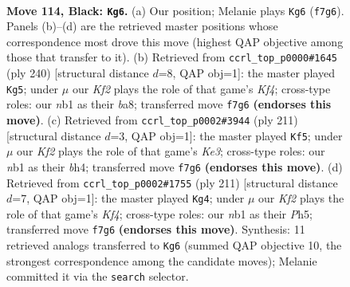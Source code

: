 \documentclass[11pt]{article}
\begin{document}
\clearpage

\begin{figure}[p]\centering
\begin{subfigure}{0.46\textwidth}\centering
\resizebox{\linewidth}{!}{%
\newchessgame
\chessboard[
  setfen={8/5k2/8/4B3/p1p3b1/8/5K2/1N6 b - - 83 114},
  showmover=false,
  pgfstyle=straightmove, color=movearrow, markmove={f7-g6}
]}
\caption{}
\end{subfigure}\hfill
\begin{subfigure}{0.46\textwidth}\centering
\resizebox{\linewidth}{!}{%
\newchessgame
\chessboard[
  setfen={b4B2/P7/4k3/2P5/5K2/8/8/8 w - - 11 121},
  showmover=false,
  pgfstyle=straightmove, color=movearrow, markmove={f4-g5}
]}
\caption{}
\end{subfigure}
\\[4pt]
\begin{subfigure}{0.46\textwidth}\centering
\resizebox{\linewidth}{!}{%
\newchessgame
\chessboard[
  setfen={8/1b6/4k3/7p/5p1B/8/8/6K1 b - - 59 106},
  showmover=false,
  pgfstyle=straightmove, color=movearrow, markmove={e6-f5}
]}
\caption{}
\end{subfigure}\hfill
\begin{subfigure}{0.46\textwidth}\centering
\resizebox{\linewidth}{!}{%
\newchessgame
\chessboard[
  setfen={b7/8/8/5k1p/7P/2B5/4K3/8 b - - 14 106},
  showmover=false,
  pgfstyle=straightmove, color=movearrow, markmove={f5-g4}
]}
\caption{}
\end{subfigure}
\caption{\textbf{Move 114, Black: \texttt{Kg6}.} (a) Our position; Melanie plays \texttt{Kg6} (\texttt{f7g6}). Panels (b)--(d) are the retrieved master positions whose correspondence most drove this move (highest QAP objective among those that transfer to it). (b) Retrieved from \texttt{ccrl\_top\_p0000\#1645} (ply 240) [structural distance $d$=8, QAP obj=1]: the master played \texttt{Kg5}; under $\mu$ our \emph{Kf2} plays the role of that game's \emph{Kf4}; cross-type roles: our \emph{n}b1 as their \emph{b}a8; transferred move \texttt{f7g6} \textbf{(endorses this move)}. (c) Retrieved from \texttt{ccrl\_top\_p0002\#3944} (ply 211) [structural distance $d$=3, QAP obj=1]: the master played \texttt{Kf5}; under $\mu$ our \emph{Kf2} plays the role of that game's \emph{Ke3}; cross-type roles: our \emph{n}b1 as their \emph{b}h4; transferred move \texttt{f7g6} \textbf{(endorses this move)}. (d) Retrieved from \texttt{ccrl\_top\_p0002\#1755} (ply 211) [structural distance $d$=7, QAP obj=1]: the master played \texttt{Kg4}; under $\mu$ our \emph{Kf2} plays the role of that game's \emph{Kf4}; cross-type roles: our \emph{n}b1 as their \emph{P}h5; transferred move \texttt{f7g6} \textbf{(endorses this move)}. Synthesis: 11 retrieved analogs transferred to \texttt{Kg6} (summed QAP objective 10, the strongest correspondence among the candidate moves); Melanie committed it via the \texttt{search} selector.}
\label{fig:thought-m227}
\end{figure}
\end{document}
